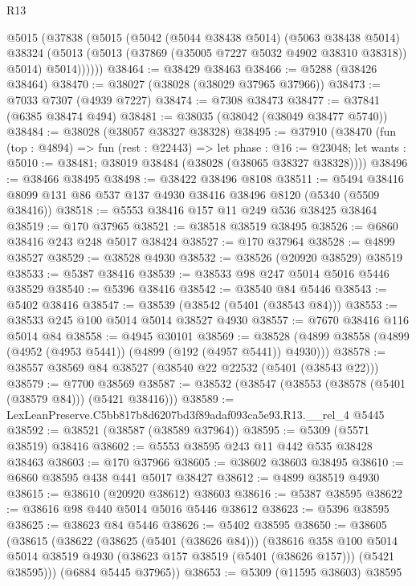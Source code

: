 \begin{lexlean}{R13}
\begin{coremodule}
      @5015
        (@37838
          (@5015
            (@5042
              (@5044 @38438 @5014)
              (@5063 @38438 @5014)
              @38324
              (@5013 (@5013 (@37869 (@35005 @7227 @5032 @4902 @38310 @38318)) @5014) @5014))))))
@38464 := @38429 @38463
@38466 := @5288 (@38426 @38464)
@38470 := @38027 (@38028 (@38029 @37965 @37966))
@38473 := @7033 @7307 (@4939 @7227)
@38474 := @7308 @38473
@38477 := @37841 (@6385 @38474 @494)
@38481 := @38035 (@38042 (@38049 @38477 @5740))
@38484 := @38028 (@38057 @38327 @38328)
@38495 := @37910
    (@38470
      (fun (top : @4894) =>
      fun (rest : @22443) =>
      let phase : @16 := @23048;
      let wants : @5010 := @38481; @38019 @38484 (@38028 (@38065 @38327 @38328))))
@38496 := @38466 @38495
@38498 := @38422 @38496 @8108
@38511 := @5494 @38416 @8099 @131 @86 @537 @137 @4930 @38416 @38496 @8120 (@5340 (@5509 @38416))
@38518 := @5553 @38416 @157 @11 @249 @536 @38425 @38464
@38519 := @170 @37965
@38521 := @38518 @38519 @38495
@38526 := @6860 @38416 @243 @248 @5017 @38424
@38527 := @170 @37964
@38528 := @4899 @38527
@38529 := @38528 @4930
@38532 := @38526 (@20920 @38529) @38519
@38533 := @5387 @38416
@38539 := @38533 @98 @247 @5014 @5016 @5446 @38529
@38540 := @5396 @38416
@38542 := @38540 @84 @5446
@38543 := @5402 @38416
@38547 := @38539 (@38542 (@5401 (@38543 @84)))
@38553 := @38533 @245 @100 @5014 @5014 @38527 @4930
@38557 := @7670 @38416 @116 @5014 @84
@38558 := @4945 @30101
@38569 := @38528 (@4899 @38558 (@4899 (@4952 (@4953 @5441)) (@4899 (@192 (@4957 @5441)) @4930)))
@38578 := @38557 @38569 @84 @38527 (@38540 @22 @22532 (@5401 (@38543 @22)))
@38579 := @7700 @38569
@38587 := @38532 (@38547 (@38553 (@38578 (@5401 (@38579 @84))) (@5421 @38416)))
@38589 := LexLeanPreserve.C5bb817b8d6207bd3f89adaf093ca5e93.R13.__rel_4 @5445
@38592 := @38521 (@38587 (@38589 @37964))
@38595 := @5309 (@5571 @38519) @38416
@38602 := @5553 @38595 @243 @11 @442 @535 @38428 @38463
@38603 := @170 @37966
@38605 := @38602 @38603 @38495
@38610 := @6860 @38595 @438 @441 @5017 @38427
@38612 := @4899 @38519 @4930
@38615 := @38610 (@20920 @38612) @38603
@38616 := @5387 @38595
@38622 := @38616 @98 @440 @5014 @5016 @5446 @38612
@38623 := @5396 @38595
@38625 := @38623 @84 @5446
@38626 := @5402 @38595
@38650 := @38605
    (@38615
      (@38622
        (@38625 (@5401 (@38626 @84)))
        (@38616
          @358
          @100
          @5014
          @5014
          @38519
          @4930
          (@38623 @157 @38519 (@5401 (@38626 @157)))
          (@5421 @38595)))
      (@6884 @5445 @37965))
@38653 := @5309 (@11595 @38603) @38595

\end{coremodule}
\end{lexlean}

